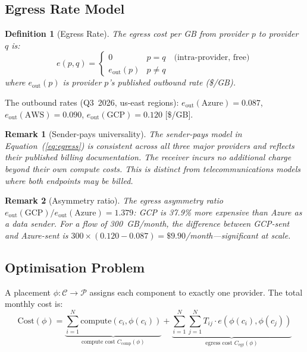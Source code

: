 \documentclass[10pt,journal]{IEEEtran}
\newtheorem{definition}{Definition}
\newtheorem{remark}{Remark}
\begin{document}
\subsection{Egress Rate Model}

\begin{definition}[Egress Rate]\label{def:egress}
The egress cost per GB from provider $p$ to provider $q$ is:
\begin{equation}\label{eq:egress}
e(p, q) =
\begin{cases}
0 & p = q \quad\text{(intra-provider, free)}\\
e_{\text{out}}(p) & p \neq q
\end{cases}
\end{equation}
where $e_{\text{out}}(p)$ is provider $p$'s published outbound rate (\$/GB).
\end{definition}

The outbound rates (Q3~2026, us-east regions):
$e_{\text{out}}(\text{Azure}) = 0.087$,
$e_{\text{out}}(\text{AWS}) = 0.090$,
$e_{\text{out}}(\text{GCP}) = 0.120$ [\$/GB].

\begin{remark}[Sender-pays universality]
The sender-pays model in Equation~(\ref{eq:egress}) is consistent across all three
major providers and reflects their published billing documentation.
The receiver incurs no additional charge beyond their own compute costs.
This is distinct from telecommunications models where both endpoints may be billed.
\end{remark}

\begin{remark}[Asymmetry ratio]
The egress asymmetry ratio $e_{\text{out}}(\text{GCP}) / e_{\text{out}}(\text{Azure})
= 1.379$: GCP is 37.9\% more expensive than Azure as a data sender.
For a flow of 300~GB/month, the difference between GCP-sent and Azure-sent is
$300 \times (0.120 - 0.087) = \$9.90$/month---significant at scale.
\end{remark}

\subsection{Optimisation Problem}

A placement $\phi: \mathcal{C} \to \mathcal{P}$ assigns each component to exactly
one provider.
The total monthly cost is:
\begin{equation}\label{eq:total_cost}
\text{Cost}(\phi) =
  \underbrace{\sum_{i=1}^{N} \text{compute}(c_i,\phi(c_i))}_{\text{compute cost } C_\text{comp}(\phi)} +
  \underbrace{\sum_{i=1}^{N}\sum_{j=1}^{N} T_{ij} \cdot e(\phi(c_i),\phi(c_j))}_{\text{egress cost } C_\text{egr}(\phi)}
\end{equation}
\end{document}
